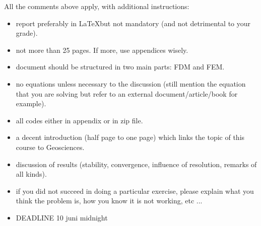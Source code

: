 All the comments above apply, with additional instructions:
\begin{itemize}
\item report preferably in \LaTeX but not mandatory (and not detrimental to your grade).
\item not more than 25 pages. If more, use appendices wisely.
\item document should be structured in two main parts: FDM and FEM.
\item no equations unless necessary to the discussion (still mention the equation that 
you are solving but refer to an external document/article/book for example).
\item all codes either in appendix or in zip file.
\item a decent introduction (half page to one page) which links the topic of this course to Geosciences.
\item discussion of results (stability, convergence, influence of resolution, remarks of all kinds).
\item if you did not succeed in doing a particular exercise, please explain what you think the problem is, 
how you know it is not working, etc ...
\item DEADLINE 10 juni midnight 
\end{itemize}









